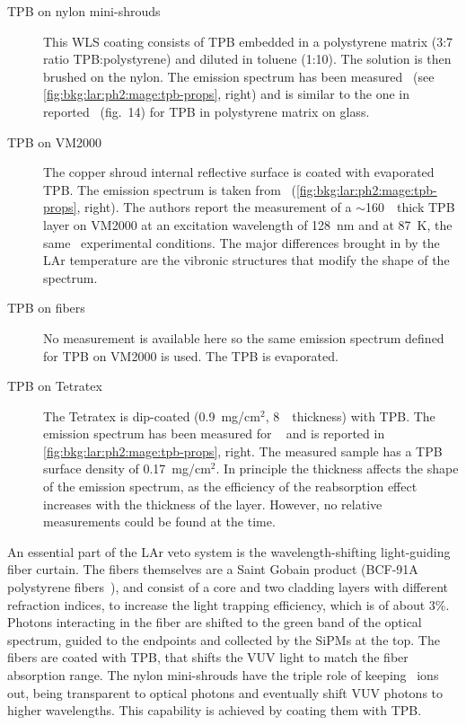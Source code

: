 \begin{description}

  \item[TPB on nylon mini-shrouds] This WLS coating consists of TPB embedded in a
    polystyrene matrix (3:7 ratio TPB:polystyrene) and diluted in toluene (1:10).  The
    solution is then brushed on the nylon. The emission spectrum has been
    measured~\cite{Walter2015} (see \cref{fig:bkg:lar:ph2:mage:tpb-props}, right) and is
    similar to the one in reported~\cite{Francini2013} (fig.~14) for TPB in polystyrene
    matrix on glass.

  \item[TPB on VM2000] The copper shroud internal reflective surface is coated with
    evaporated TPB. The emission spectrum is taken from~\cite{Francini2013}
    (\cref{fig:bkg:lar:ph2:mage:tpb-props}, right).  The authors report the measurement of
    a $\sim$160~\mum\ thick TPB layer on VM2000 at an excitation wavelength of 128~nm and
    at 87~K, the same \gerda\ experimental conditions. The major differences brought in by
    the LAr temperature are the vibronic structures that modify the shape of the spectrum.

  \item[TPB on fibers] No measurement is available here so the same emission spectrum
    defined for TPB on VM2000 is used. The TPB is evaporated.

  \item[TPB on Tetratex\reg{}] The Tetratex\reg{} is dip-coated (0.9~mg/cm$^2$, 8~\mum\
    thickness) with TPB. The emission spectrum has been measured for
    \gerda~\cite{Baudis2015a} and is reported in \cref{fig:bkg:lar:ph2:mage:tpb-props},
    right. The measured sample has a TPB surface density of 0.17~mg/cm$^2$. In principle
    the thickness affects the shape of the emission spectrum, as the efficiency of the
    reabsorption effect increases with the thickness of the layer. However, no relative
    measurements could be found at the time.

\end{description}

An essential part of the LAr veto system is the wavelength-shifting light-guiding fiber
curtain. The fibers themselves are a Saint Gobain product (BCF-91A polystyrene
fibers~\cite{FibersData}), and consist of a core and two cladding layers with different
refraction indices, to increase the light trapping efficiency, which is of about 3\%.
Photons interacting in the fiber are shifted to the green band of the optical spectrum,
guided to the endpoints and collected by the SiPMs at the top. The fibers are coated with
TPB, that shifts the VUV light to match the fiber absorption range.
\newpar
The nylon mini-shrouds have the triple role of keeping \kvz\ ions out, being transparent
to optical photons and eventually shift VUV photons to higher wavelengths. This capability
is achieved by coating them with TPB.


